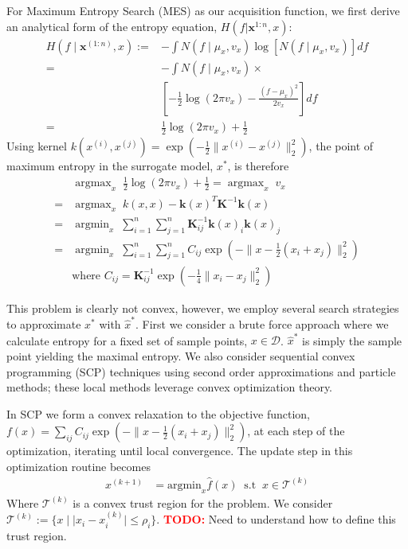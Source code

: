 \documentclass[10pt,twocolumn,letterpaper]{article}
\begin{document}
For Maximum Entropy Search (MES) as our acquisition function, we first derive an analytical form of the entropy equation, $H(f | \textbf{x}^{1:n}, x)$:
\begin{align*}
    H(f \mid \textbf{x}^{(1:n)}, x) :=& -\int N(f \mid \mu_x, v_x) \log\left[N(f \mid \mu_x, v_x)\right]df\\
    =& -\int N(f \mid \mu_x, v_x) \times \\
    & \left[-\frac{1}{2}\log(2\pi v_x) - \frac{(f - \mu_x)^2}{2v_x}\right]df\\
    =& \frac{1}{2}\log(2\pi v_x) + \frac{1}{2}
\end{align*}
Using kernel $k(x^{(i)}, x^{(j)}) = \exp\left(-\frac{1}{2}\lVert x^{(i)} - x^{(j)}\rVert^2_2\right)$, the point of maximum entropy in the surrogate model, $x^*$, is therefore
\begin{align*}
    &\; \textrm{argmax}_x \;\; \frac{1}{2}\log(2\pi v_x) + \frac{1}{2} = \; \textrm{argmax}_x \;\; v_x \\
    =&\; \textrm{argmax}_x \;\; k(x, x) - \textbf{k}(x)^T\textbf{K}^{-1}\textbf{k}(x)\\
    =&\; \textrm{argmin}_x \;\; \sum_{i=1}^n\sum_{j=1}^n \textbf{K}^{-1}_{ij} \textbf{k}(x)_i \textbf{k}(x)_j\\
    =&\; \textrm{argmin}_x \;\; \sum_{i=1}^n\sum_{j=1}^n C_{ij} \exp\left(-\lVert x - \frac{1}{2}(x_i + x_j)\rVert _2^2\right)\\
    &\textrm{where } C_{ij} = \textbf{K}^{-1}_{ij}\exp(-\frac{1}{4}\lVert x_i - x_j\rVert^2_2)
\end{align*}

This problem is clearly not convex, however, we employ several search strategies to approximate $x^*$ with $\hat{x}^*$. First we consider a brute force approach where we calculate entropy for a fixed set of sample points, $x \in \mathcal{D}$. $\hat{x}^*$ is simply the sample point yielding the maximal entropy. We also consider sequential convex programming (SCP) techniques using second order approximations and particle methods; these local methods leverage convex optimization theory.

In SCP we form a convex relaxation to the objective function, $f(x) =  \sum_{ij} C_{ij} \exp\left(-\lVert x - \frac{1}{2}(x_i + x_j)\rVert _2^2\right)$, at each step of the optimization, iterating until local convergence. The update step in this optimization routine becomes
\begin{align*}
    x^{(k+1)} &= \textrm{argmin}_x \hat{f}(x) \;\; \textrm{s.t} \;\; x \in \mathcal{T}^{(k)}
\end{align*}
Where $\mathcal{T}^{(k)}$ is a convex trust region for the problem. We consider $\mathcal{T}^{(k)} := \{x \mid \lvert x_i - x_i^{(k)}\rvert \leq \rho_i\}$. \textcolor{red}{\textbf{TODO:}} Need to understand how to define this trust region.
\end{document}
